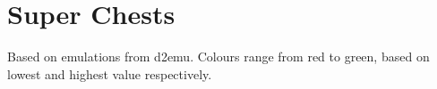 \chapter{Super Chests}

Based on emulations from d2emu\cite{d2emu}. Colours range from red to green, based on lowest and highest value respectively.

\newcommand{\SCMin}{0}
\newcommand{\SCMax}{26}

